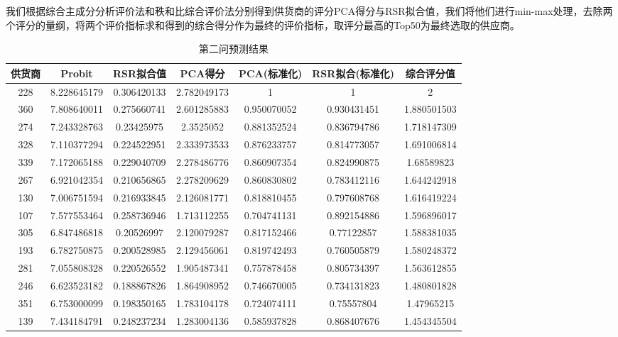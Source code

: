 \documentclass[UTF8]{ctexart}
\begin{document}
我们根据综合主成分分析评价法和秩和比综合评价法分别得到供货商的评分PCA得分与RSR拟合值，我们将他们进行min-max处理，去除两个评分的量纲，将两个评价指标求和得到的综合得分作为最终的评价指标，取评分最高的Top50为最终选取的供应商。
\begin{center}
	\begin{longtable}{|c|c|c|c|c|c|c|}
		\caption{第二问预测结果}
		\label{tab:dasfa}                                                                              \\
		\hline
		供货商 & Probit      & RSR拟合值   & PCA得分     & PCA(标准化) & RSR拟合(标准化) & 综合评分值  \\ \hline
		228    & 8.228645179 & 0.306420133 & 2.782049173 & 1           & 1               & 2           \\ \hline
		360    & 7.808640011 & 0.275660741 & 2.601285883 & 0.950070052 & 0.930431451     & 1.880501503 \\ \hline
		274    & 7.243328763 & 0.23425975  & 2.3525052   & 0.881352524 & 0.836794786     & 1.718147309 \\ \hline
		328    & 7.110377294 & 0.224522951 & 2.333973533 & 0.876233757 & 0.814773057     & 1.691006814 \\ \hline
		339    & 7.172065188 & 0.229040709 & 2.278486776 & 0.860907354 & 0.824990875     & 1.68589823  \\ \hline
		267    & 6.921042354 & 0.210656865 & 2.278209629 & 0.860830802 & 0.783412116     & 1.644242918 \\ \hline
		130    & 7.006751594 & 0.216933845 & 2.126081771 & 0.818810455 & 0.797608768     & 1.616419224 \\ \hline
		107    & 7.577553464 & 0.258736946 & 1.713112255 & 0.704741131 & 0.892154886     & 1.596896017 \\ \hline
		305    & 6.847486818 & 0.20526997  & 2.120079287 & 0.817152466 & 0.77122857      & 1.588381035 \\ \hline
		193    & 6.782750875 & 0.200528985 & 2.129456061 & 0.819742493 & 0.760505879     & 1.580248372 \\ \hline
		281    & 7.055808328 & 0.220526552 & 1.905487341 & 0.757878458 & 0.805734397     & 1.563612855 \\ \hline
		246    & 6.623523182 & 0.188867826 & 1.864908952 & 0.746670005 & 0.734131823     & 1.480801828 \\ \hline
		351    & 6.753000099 & 0.198350165 & 1.783104178 & 0.724074111 & 0.75557804      & 1.47965215  \\ \hline
		139    & 7.434184791 & 0.248237234 & 1.283004136 & 0.585937828 & 0.868407676     & 1.454345504 \\ \hline

\end{longtable}
\end{center}
\end{document}
